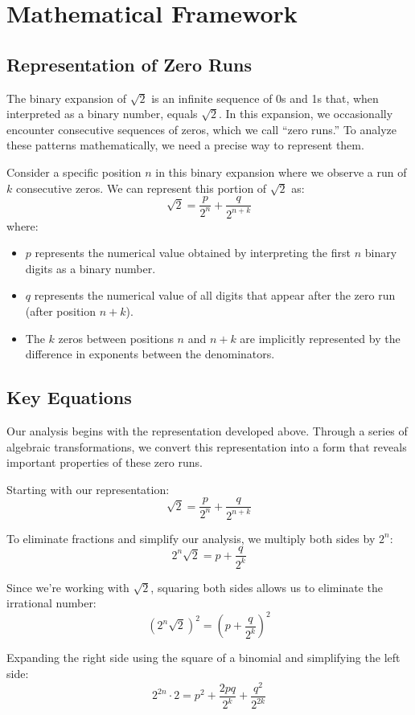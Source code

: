\section{Mathematical Framework}

\subsection{Representation of Zero Runs}
The binary expansion of $\sqrt{2}$ is an infinite sequence of 0s and 1s that, when interpreted as a binary number, equals $\sqrt{2}$. In this expansion, we occasionally encounter consecutive sequences of zeros, which we call ``zero runs.'' To analyze these patterns mathematically, we need a precise way to represent them.

Consider a specific position $n$ in this binary expansion where we observe a run of $k$ consecutive zeros. We can represent this portion of $\sqrt{2}$ as:
\[
\sqrt{2} = \frac{p}{2^n} + \frac{q}{2^{n+k}}
\]
where:
\begin{itemize}
    \item $p$ represents the numerical value obtained by interpreting the first $n$ binary digits as a binary number.
    \item $q$ represents the numerical value of all digits that appear after the zero run (after position $n+k$).
    \item The $k$ zeros between positions $n$ and $n+k$ are implicitly represented by the difference in exponents between the denominators.
\end{itemize}

\subsection{Key Equations}
Our analysis begins with the representation developed above. Through a series of algebraic transformations, we convert this representation into a form that reveals important properties of these zero runs.

Starting with our representation:
\[
\sqrt{2} = \frac{p}{2^n} + \frac{q}{2^{n+k}}
\]

To eliminate fractions and simplify our analysis, we multiply both sides by $2^n$:
\[
2^n \sqrt{2} = p + \frac{q}{2^k}
\]

Since we're working with $\sqrt{2}$, squaring both sides allows us to eliminate the irrational number:
\[
(2^n \sqrt{2})^2 = \left(p + \frac{q}{2^k}\right)^2
\]

Expanding the right side using the square of a binomial and simplifying the left side:
\[
2^{2n} \cdot 2 = p^2 + \frac{2pq}{2^k} + \frac{q^2}{2^{2k}}
\]


